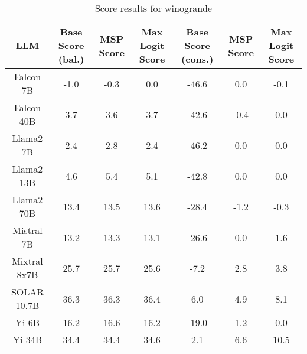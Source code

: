 \renewcommand\arraystretch{1.2}
\begin{table*}
\centering
\begin{tabular}{c|c|c|c|c|c|c}
LLM & Base Score (bal.) & MSP Score & Max Logit Score & Base Score (cons.) & MSP Score & Max Logit Score\\ \hline
Falcon 7B & -1.0 & -0.3 & 0.0 & -46.6 & 0.0 & -0.1\\
Falcon 40B & 3.7 & 3.6 & 3.7 & -42.6 & -0.4 & 0.0\\
Llama2 7B & 2.4 & 2.8 & 2.4 & -46.2 & 0.0 & 0.0\\
Llama2 13B & 4.6 & 5.4 & 5.1 & -42.8 & 0.0 & 0.0\\
Llama2 70B & 13.4 & 13.5 & 13.6 & -28.4 & -1.2 & -0.3\\
Mistral 7B & 13.2 & 13.3 & 13.1 & -26.6 & 0.0 & 1.6\\
Mixtral 8x7B & 25.7 & 25.7 & 25.6 & -7.2 & 2.8 & 3.8\\
SOLAR 10.7B & 36.3 & 36.3 & 36.4 & 6.0 & 4.9 & 8.1\\
Yi 6B & 16.2 & 16.6 & 16.2 & -19.0 & 1.2 & 0.0\\
Yi 34B & 34.4 & 34.4 & 34.6 & 2.1 & 6.6 & 10.5\\
\hline
\end{tabular}
\caption{Score results for winogrande}
\end{table*}
\label{tab:winogrande_score}
